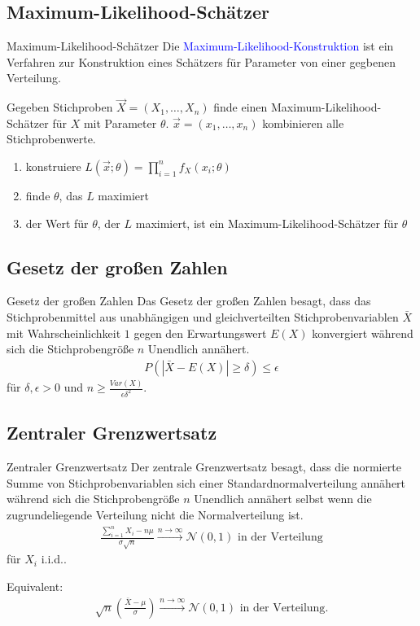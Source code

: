 \documentclass{beamer}
\def\padding{\vspace{0.5cm}}
\def\spadding{\vspace{0.25cm}}
\def\b{\textcolor{blue}}
\begin{document}
\subsection{Maximum-Likelihood-Schätzer}
\begin{frame}{Maximum-Likelihood-Schätzer}
    Die \b{Maximum-Likelihood-Konstruktion} ist ein Verfahren zur Konstruktion eines Schätzers für Parameter von einer gegbenen Verteilung.\pause\par\padding
    Gegeben Stichproben $\overrightarrow{X} = (X_1, \dots, X_n)$ finde einen Maximum-Likelihood-Schätzer für $X$ mit Parameter $\theta$. $\overrightarrow{x} = (x_1, \dots, x_n)$ kombinieren alle Stichprobenwerte.
    \begin{enumerate}
        \item konstruiere $L(\overrightarrow{x}; \theta) = \prod_{i=1}^n f_X(x_i; \theta)$
        \item finde $\theta$, das $L$ maximiert
        \item der Wert für $\theta$, der $L$ maximiert, ist ein Maximum-Likelihood-Schätzer für $\theta$
    \end{enumerate}
\end{frame}

\subsection{Gesetz der großen Zahlen}
\begin{frame}{Gesetz der großen Zahlen}
    Das Gesetz der großen Zahlen besagt, dass das Stichprobenmittel aus unabhängigen und gleichverteilten Stichprobenvariablen $\bar{X}$ mit Wahrscheinlichkeit $1$ gegen den Erwartungswert $E(X)$ konvergiert während sich die Stichprobengröße $n$ Unendlich annähert.\pause
    \begin{align*}
        P(|\bar{X} - E(X)| \geq \delta) \leq \epsilon
    \end{align*}
    für $\delta, \epsilon > 0$ und $n \geq \frac{Var(X)}{\epsilon \delta^2}$.
\end{frame}

\subsection{Zentraler Grenzwertsatz}
\begin{frame}{Zentraler Grenzwertsatz}
    Der zentrale Grenzwertsatz besagt, dass die normierte Summe von Stichprobenvariablen sich einer Standardnormalverteilung annähert  während sich die Stichprobengröße $n$ Unendlich annähert selbst wenn die zugrundeliegende Verteilung nicht die Normalverteilung ist.\pause
    \begin{align*}
        \frac{\sum_{i=1}^n X_i - n \mu}{\sigma \sqrt{n}} \xrightarrow{n \to \infty} \mathcal{N}(0,1) \text{ in der Verteilung}
    \end{align*}
    für $X_i$ i.i.d..\pause\par\spadding
    Equivalent:
    \begin{align*}
        \sqrt{n} \left(\frac{\bar{X} - \mu}{\sigma}\right) \xrightarrow{n \to \infty} \mathcal{N}(0,1) \text{ in der Verteilung}.
    \end{align*}
\end{frame}
\end{document}
